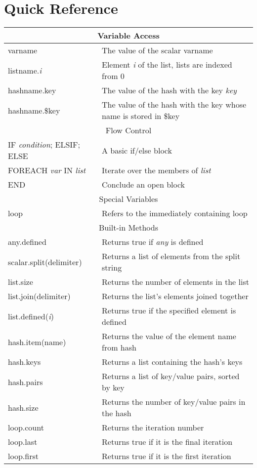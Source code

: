 \documentclass[english]{article}
\begin{document}
\section{Quick Reference}
\begin{tabular}{|l|p{7cm}|}
\hline
\multicolumn{2}{|c|}{Variable Access}\\
\hline
varname & The value of the scalar varname\\
listname.\emph{i} & Element \emph{i} of the list, lists are indexed from 0\\
hashname.key & The value of the hash with the key \emph{key}\\
hashname.\$key & The value of the hash with the key whose name is stored in \$key\\
\hline
\multicolumn{2}{|c|}{Flow Control}\\
\hline
IF \emph{condition}; ELSIF; ELSE & A basic if/else block \\ 
FOREACH \emph{var} IN \emph{list} & Iterate over the members of \emph{list}\\
END & Conclude an open block \\
\hline
\multicolumn{2}{|c|}{Special Variables}\\
\hline
loop & Refers to the immediately containing loop\\
\hline
\multicolumn{2}{|c|}{Built-in Methods}\\
\hline
any.defined & Returns true if \emph{any} is defined\\
scalar.split(delimiter) & Returns a list of elements from the split string\\
list.size & Returns the number of elements in the list\\
list.join(delimiter) & Returns the list's elements joined together\\
list.defined(\emph{i}) & Returns true if the specified element is defined\\
hash.item(name) & Returns the value of the element name from hash\\
hash.keys & Returns a list containing the hash's keys\\
hash.pairs & Returns a list of key/value pairs, sorted by key\\
hash.size & Returns the number of key/value pairs in the hash\\
loop.count & Returns the iteration number\\
loop.last & Returns true if it is the final iteration\\
loop.first & Returns true if it is the first iteration\\

\end{tabular}
\end{document}
